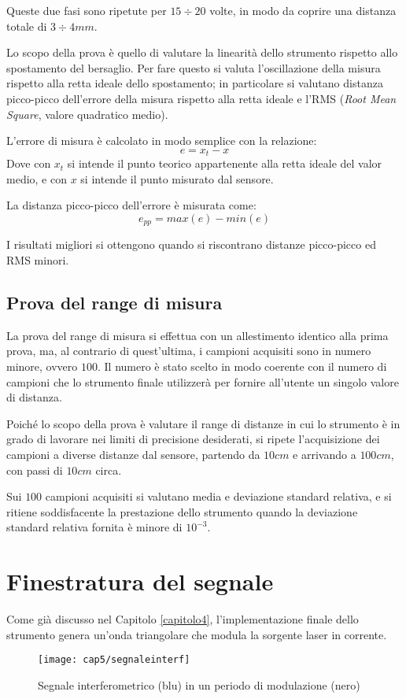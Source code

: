 Queste due fasi sono ripetute per $15 \div 20$ volte, in modo da coprire una distanza totale di $3 \div 4 mm$.

Lo scopo della prova è quello di valutare la linearità dello strumento rispetto allo spostamento del bersaglio. Per fare questo si valuta l'oscillazione della misura rispetto alla retta ideale dello spostamento; in particolare si valutano distanza picco-picco dell'errore della misura rispetto alla retta ideale e l'RMS (\textit{Root Mean Square}, valore quadratico medio).

L'errore di misura è calcolato in modo semplice con la relazione:
\begin{equation}
	e = x_t - x 
\end{equation}
Dove con $x_t$ si intende il punto teorico appartenente alla retta ideale del valor medio, e con $x$ si intende il punto misurato dal sensore. 

La distanza picco-picco dell'errore è misurata come:
\begin{equation}
	e_{pp} = max(e) - min(e)
\end{equation}

I risultati migliori si ottengono quando si riscontrano distanze picco-picco ed RMS minori.

\subsection{Prova del range di misura}
La prova del range di misura si effettua con un allestimento identico alla prima prova, ma, al contrario di quest'ultima, i campioni acquisiti sono in numero minore, ovvero $100$. Il numero è stato scelto in modo coerente con il numero di campioni che lo strumento finale utilizzerà per fornire all'utente un singolo valore di distanza. 

Poiché lo scopo della prova è valutare il range di distanze in cui lo strumento è in grado di lavorare nei limiti di precisione desiderati, si ripete l'acquisizione dei campioni a diverse distanze dal sensore, partendo da $10 cm$ e arrivando a $100 cm$, con passi di $10 cm$ circa.

Sui $100$ campioni acquisiti si valutano media e deviazione standard relativa, e si ritiene soddisfacente la prestazione dello strumento quando la deviazione standard relativa fornita è minore di $10^{-3}$.

\section{Finestratura del segnale}
Come già discusso nel Capitolo \ref{capitolo4}, l'implementazione finale dello strumento genera un'onda triangolare che modula la sorgente laser in corrente.
\begin{figure}[H]
	\begin{center}
		\texttt{[image: cap5/segnaleinterf]}
		\caption{Segnale interferometrico (blu) in un periodo di modulazione (nero)}
		\label{segnaleinterf}
	\end{center}
\end{figure}

